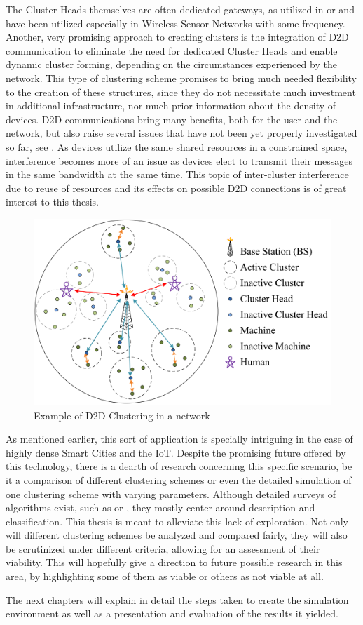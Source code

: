 The Cluster Heads themselves are often dedicated gateways, as utilized in \cite{Niyato2011} or \cite{Shariatmadari2015} and have been utilized especially in Wireless Sensor Networks with some frequency. Another, very promising approach to creating clusters is the integration of D2D communication to eliminate the need for dedicated Cluster Heads and enable dynamic cluster forming, depending on the circumstances experienced by the network. This type of clustering scheme promises to bring much needed flexibility to the creation of these structures, since they do not necessitate much investment in additional infrastructure, nor much prior information about the density of devices. D2D communications bring many benefits, both for the user and the network, but also raise several issues that have not been yet properly investigated so far, see \cite{Klugel2014}. As devices utilize the same shared resources in a constrained space, interference becomes more of an issue as devices elect to transmit their messages in the same bandwidth at the same time. This topic of inter-cluster interference due to reuse of resources and its effects on possible D2D connections is of great interest to this thesis. 

\begin{figure}[H]
\centering
\includegraphics[scale = 0.25]{figures/D2D_clustering}
\caption{Example of D2D Clustering in a network \cite{Wang2013}}
\end{figure}

As mentioned earlier, this sort of application is specially intriguing in the case of highly dense Smart Cities and the IoT. Despite the promising future offered by this technology, there is a dearth of research concerning this specific scenario, be it a comparison of different clustering schemes or even the detailed simulation of one clustering scheme with varying parameters. Although detailed surveys of algorithms exist, such as \cite{Jiang2009} or \cite{Afsar2014}, they mostly center around description and classification. This thesis is meant to alleviate this lack of exploration. Not only will different clustering schemes be analyzed and compared fairly, they will also be scrutinized under different criteria, allowing for an assessment of their viability. This will hopefully give a direction to future possible research in this area, by highlighting some of them as viable or others as not viable at all.


The next chapters will explain in detail the steps taken to create the simulation environment as well as a presentation and evaluation of the results it yielded.